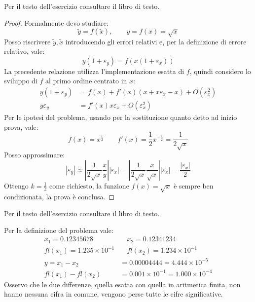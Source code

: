 \begin{exercise}[1.16]
Per il testo dell'esercizio consultare il libro di testo.
\end{exercise}
\begin{proof}
Formalmente devo studiare:
\begin{displaymath}
	\tilde{y} = f(\tilde{x}), \quad \quad y = f(x) = \sqrt{x}
\end{displaymath}
Posso riscrivere $\tilde{y}, \tilde{x}$ introducendo gli errori relativi e, per 
la definizione di errore relativo, vale:
\begin{displaymath}
	y(1 + \varepsilon_{y}) = f(x(1 + \varepsilon_{x}))
\end{displaymath}
La precedente relazione utilizza l'implementazione esatta di $f$, quindi considero
lo sviluppo di $f$ al primo ordine centrato in $x$:
\begin{displaymath}
\begin{split}
	y(1 + \varepsilon_{y}) & = f(x) + f'(x)(x + x\varepsilon_{x} - x) + O(\varepsilon_{x}^{2}) \\
	y\varepsilon_{y} & = f'(x)x\varepsilon_{x} + O(\varepsilon_{x}^{2})
\end{split}
\end{displaymath}
Per le ipotesi del problema, usando per la sostituzione quanto detto ad inizio prova, vale:
\begin{displaymath}
f(x) = x^{\frac{1}{2}} \quad \quad f'(x) = \frac{1}{2}x^{-\frac{1}{2}} 
= \frac{1}{2\sqrt{x}}
\end{displaymath}
Posso approssimare:
\begin{displaymath}
|\varepsilon_{y}| \approx \left | \frac{1}{2\sqrt{x}} \frac{x}{y} \right||\varepsilon_{x}|= 
\left | \frac{1}{2\sqrt{x}} \frac{x}{\sqrt{x}} \right||\varepsilon_{x}| = 
\frac{|\varepsilon_{x}|}{2}
\end{displaymath}
Ottengo $k = \frac{1}{2}$ come richiesto, la funzione $f(x) = \sqrt{x}$
\`e sempre ben condizionata, la prova \`e conclusa.
\end{proof}

\begin{exercise}[1.17]
Per il testo dell'esercizio consultare il libro di testo.
\end{exercise}
Per la definizione del problema vale:
\begin{displaymath}
\begin{split}
	x_{1} = 0.12345678 & \quad x_{2} = 0.12341234 \\
	fl(x_{1}) = 1.235 \times 10^{-1} & \quad fl(x_{2}) = 1.234 \times 10^{-1} \\
	y = x_{1} - x_{2} &= 0.00004444 = 4.444 \times 10^{-5} \\
	fl(x_{1}) - fl(x_{2}) &= 0.001 \times 10^{-1} = 1.000 \times 10^{-4}
\end{split}
\end{displaymath}
Osservo che le due differenze, quella esatta con quella in aritmetica finita,
non hanno nessuna cifra in comune, vengono perse tutte le cifre significative.

